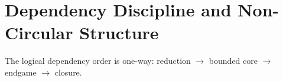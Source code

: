 \documentclass[11pt,a4paper]{article}
\begin{document}
\section{Dependency Discipline and Non-Circular Structure}
The logical dependency order is one-way: reduction \(\to\) bounded core \(\to\) endgame \(\to\) closure.

\end{document}
